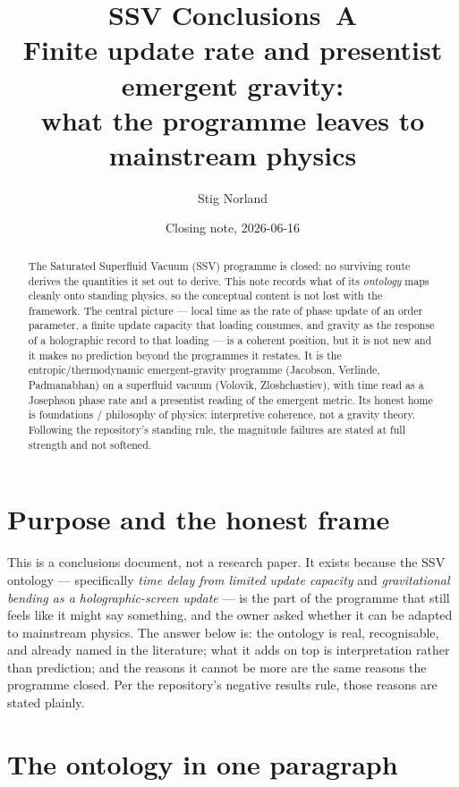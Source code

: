 \documentclass[11pt]{article}
\title{SSV Conclusions~A\\[2pt]
\large Finite update rate and presentist emergent gravity:\\
what the programme leaves to mainstream physics}
\author{Stig Norland}
\date{Closing note, 2026-06-16}
\begin{document}
\maketitle

\begin{abstract}
The Saturated Superfluid Vacuum (SSV) programme is closed: no surviving route
derives the quantities it set out to derive. This note records what of its
\emph{ontology} maps cleanly onto standing physics, so the conceptual content is
not lost with the framework. The central picture --- local time as the rate of
phase update of an order parameter, a finite update capacity that loading
consumes, and gravity as the response of a holographic record to that loading ---
is a coherent position, but it is not new and it makes no prediction beyond the
programmes it restates. It is the entropic/thermodynamic emergent-gravity
programme (Jacobson, Verlinde, Padmanabhan) on a superfluid vacuum (Volovik,
Zloshchastiev), with time read as a Josephson phase rate and a presentist reading
of the emergent metric. Its honest home is foundations / philosophy of physics:
interpretive coherence, not a gravity theory. Following the repository's
standing rule, the magnitude failures are stated at full strength and not
softened.
\end{abstract}

\section{Purpose and the honest frame}

This is a conclusions document, not a research paper. It exists because the SSV
ontology --- specifically \emph{time delay from limited update capacity} and
\emph{gravitational bending as a holographic-screen update} --- is the part of
the programme that still feels like it might say something, and the owner asked
whether it can be adapted to mainstream physics. The answer below is: the
ontology is real, recognisable, and already named in the literature; what it
adds on top is interpretation rather than prediction; and the reasons it cannot
be more are the same reasons the programme closed. Per the repository's negative
results rule, those reasons are stated plainly.

\section{The ontology in one paragraph}
\end{document}
